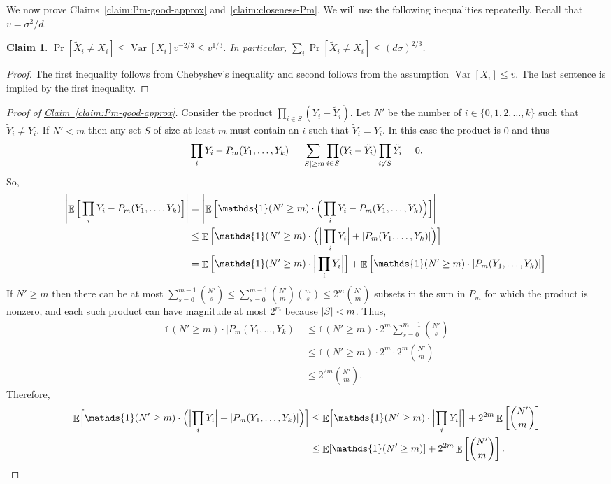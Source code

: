 \documentclass[11pt]{article}
\numberwithin{equation}{section}
\newtheorem{claim}[theorem]{Claim}
\theoremstyle{definition}
\theoremstyle{plain}
\newcommand{\expref}[2]{\hyperref[#2]{#1~\ref{#2}}}
\def\1{\mathds{1}}
\DeclarePairedDelimiter{\abs}{\lvert}{\rvert}
\DeclareMathOperator*{\E}{\mathbb{E}}                 %
\DeclareMathOperator*{\Var}{Var}                 %
\begin{document}
  We now prove Claims~\ref{claim:Pm-good-approx} and~\ref{claim:closeness-Pm}.
  We will use the following inequalities repeatedly.
  Recall that $v = \sigma^2/d$.

  \begin{claim} \label{claim-prob-x-neq-x-tilde}
    $\Pr[\tilde X_i \neq X_i] \le \Var[X_i] v^{-2/3}  \le v^{1/3}$.
    In particular, $\sum_i \Pr[\tilde X_i \neq X_i] \le (d \sigma)^{2/3}$.
  \end{claim}
  \begin{proof}
    The first inequality follows from Chebyshev's inequality and second follows from the assumption $\Var[X_i] \le v$.
    The last sentence is implied by the first inequality.
  \end{proof}

  \begin{proof} [Proof of {\expref{Claim}{claim:Pm-good-approx}}]
    Consider the product $\prod_{i \in S} (Y_i - \tilde Y_i)$.
    Let $N'$ be the number of $i \in \{0, 1, 2, \ldots, k\}$ such that $\tilde Y_i \neq Y_i$.
    If $N' < m$ then any set $S$ of size at least $m$ must contain an $i$ such that $\tilde Y_i = Y_i$.
    In this case the product is $0$ and thus
    \begin{align*}
      \prod_i Y_i - P_m(Y_1, \ldots, Y_k)
      = \sum_{\abs{S} \ge m} \prod_{i \in S} (Y_i - \tilde Y_i) \prod_{i \not\in S} \tilde Y_i
      = 0 .
    \end{align*}
    So,
    \begin{align*}
      \abs*{ \E \Big[ \prod_i Y_i - P_m(Y_1, \ldots, Y_k) \Big] }
      &= \abs*{ \E \Big[ \1(N' \ge m) \cdot \Big( \prod_i Y_i - P_m(Y_1, \ldots, Y_k) \Big) \Big] } \\
      &\le \E \Big[\1(N' \ge m) \cdot \Big( \Big| \prod_i Y_i \Big| + \abs{P_m(Y_1, \ldots, Y_k)} \Big) \Big] \\
      &= \E \Big[\1(N' \ge m) \cdot \Big| \prod_i Y_i \Big| \Big] + \E \Big[ \1(N' \ge m) \cdot \abs{P_m(Y_1, \ldots, Y_k)} \Big] .
    \end{align*}
    If $N' \ge m$ then there can be at most $\sum_{s = 0}^{m - 1} \binom{N'}{s} \le \sum_{s = 0}^{m-1} \binom{N'}{m} \binom{m}{s} \le 2^m \binom{N'}{m}$ subsets in the sum in $P_m$ for which the product is nonzero, and each such product can have magnitude at most $2^m$ because $\abs{S} < m$.
    Thus,
    \begin{align*}
      \1(N' \ge m) \cdot \Big| P_m(Y_1, \ldots, Y_k) \Big|
      &\le \1(N' \ge m) \cdot 2^m \sum_{s= 0}^{m - 1} \binom{N'}{s} \\
      &\le \1(N' \ge m) \cdot 2^m \cdot 2^m \binom{N'}{m} \\
      &\le 2^{2m} \binom{N'}{m} .
    \end{align*}
    Therefore,
    \begin{align*}
      \E \Bigl[\1(N' \ge m) \cdot \Bigl( \Bigl| \prod_i Y_i \Bigr| + \abs{P_m(Y_1, \ldots, Y_k)} \Bigr) \Bigr]
      &\le \E \Bigl[\1(N' \ge m) \cdot \Bigl| \prod_i Y_i \Bigr| \Bigr] + 2^{2m} \E \left[ \binom{N'}{m} \right] \\
      &\le \E[ \1(N' \ge m) ] + 2^{2m} \E \left[ \binom{N'}{m} \right] .
    \end{align*}


\end{proof}
\end{document}
